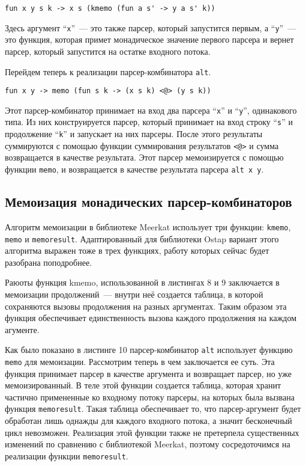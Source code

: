 \begin{lstlisting}[basicstyle=\small, numbers=none]
   fun x y s k -> x s (kmemo (fun a s' -> y a s' k))
\end{lstlisting}

Здесь аргумент ``\lstinline|х|''~--- это также парсер, который запустится первым, а ``\lstinline|y|''~--- это функция, которая примет монадическое значение первого парсера и вернет парсер, который запустится на остатке входного потока.

Перейдем теперь к реализации парсер-комбинатора \lstinline|alt|.

\begin{lstlisting}[basicstyle=\small, numbers=none]
   fun x y -> memo (fun s k -> (x s k) <@> (y s k))
\end{lstlisting}

Этот парсер-комбинатор принимает на вход два парсера ``\lstinline|x|'' и ``\lstinline|y|'', одинакового типа. Из них конструируется парсер, который принимает на вход строку ``\lstinline|s|'' и продолжение ``\lstinline|k|'' и запускает на них парсеры. После этого результаты суммируются с помощью функции суммирования результатов \lstinline|<@>| и сумма возвращается в качестве результата. Этот парсер мемоизируется с помощью функции \lstinline|memo|, и возвращается в качестве результата парсера \lstinline|alt x y|.

\subsection{Мемоизация монадических парсер-комбинаторов}

Алгоритм мемоизации в библиотеке Meerkat использует три функции: \lstinline|kmemo|, \lstinline|memo| и \lstinline|memoresult|. Адаптированный для библиотеки Ostap вариант этого алгоритма выражен тоже в трех функциях, работу которых сейчас будет разобрана поподробнее.

Раюоты функция kmemo, использованной в листингах 8 и 9 заключается в мемоизации продолжений~--- внутри неё создается таблица, в которой сохраняются вызовы продолжения на разных аргументах. Таким образом эта функция обеспечивает единственность вызова каждого продолжения на каждом агументе.

Как было показано в листинге 10 парсер-комбинатор \lstinline|alt| использует функцию \lstinline|memo| для мемоизации. Рассмотрим теперь в чем заключается ее суть. Эта функция принимает парсер в качестве аргумента и возвращает парсер, но уже мемоизированный. В теле этой функции создается таблица, которая хранит частично примененные ко входному потоку парсеры, на которых была вызвана функция \lstinline|memoresult|. Такая таблица обеспечивает то, что парсер-аргумент будет обработан лишь однажды для каждого входного потока, а значит бесконечный цикл невозможен. Реализация этой функции также не претерпела существенных изменений по сравнению с библиотекой Meerkat, поэтому сосредоточимся на реализации функции \lstinline|memoresult|.
\clearpage

